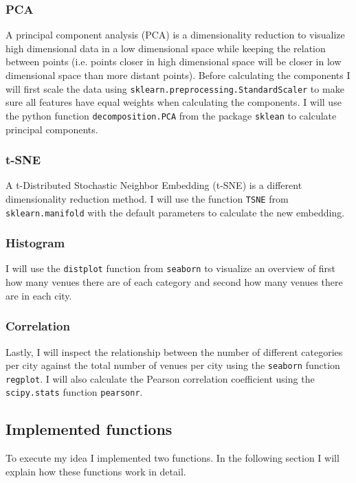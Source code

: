 \documentclass[11pt,a4paper,final]{article}
\begin{document}
\subsubsection*{PCA}
A principal component analysis (PCA) is a dimensionality reduction to visualize high dimensional data in a low dimensional space while keeping the relation between points (i.e. points closer in high dimensional space will be closer in low dimensional space than more distant points). Before calculating the components I will first scale the data using \texttt{sklearn.preprocessing.StandardScaler} to make sure all features have equal weights when calculating the components. I will use the python function \texttt{decomposition.PCA} from the package \texttt{sklean} to calculate principal components. 
\subsubsection*{t-SNE}
A t-Distributed Stochastic Neighbor Embedding (t-SNE) is a different dimensionality reduction method. I will use the function \texttt{TSNE} from \texttt{sklearn.manifold} with the default parameters to calculate the new embedding.
\subsubsection*{Histogram}
I will use the \texttt{distplot} function from \texttt{seaborn} to visualize an overview of first how many venues there are of each category and second how many venues there are in each city.
\subsubsection*{Correlation}
Lastly, I will inspect the relationship between the number of different categories per city against the total number of venues per city using the \texttt{seaborn} function \texttt{regplot}. I will also calculate the Pearson correlation coefficient using the \texttt{scipy.stats} function \texttt{pearsonr}.

\subsection{Implemented functions}
To execute my idea I implemented two functions. In the following section I will explain how these functions work in detail.
\end{document}
